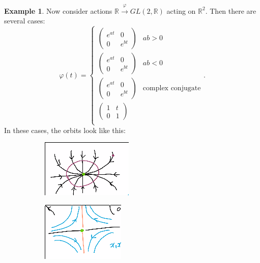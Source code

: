 \documentclass[leqno, openany]{memoir}
\theoremstyle{definition}
\newtheorem{exm}[thm]{Example}
\theoremstyle{remark}
\theoremstyle{plain}
\theoremstyle{definition}
\theoremstyle{remark}
\newcommand{\R}{\mathbb{R}}
\begin{document}
\begin{exm} Now consider actions $\R \xrightarrow{\varphi} GL(2,\R)$ acting on
    $\R^2$. Then there are several cases: \[ \varphi(t) = \begin{cases}
        \begin{pmatrix} e^{at} & 0 \\ 0 & e^{bt} \end{pmatrix} & ab > 0 \\
        \begin{pmatrix} e^{at} & 0 \\ 0 & e^{bt} \end{pmatrix} & ab < 0 \\
        \begin{pmatrix} e^{at} & 0 \\ 0 & e^{bt} \end{pmatrix} & \text{complex
        conjugate} \\ \begin{pmatrix} 1 & t \\ 0 & 1 \end{pmatrix} &  \\
    \end{cases}. \] In these cases, the orbits look like this:
    \begin{figure}[H] \centering \begin{subfigure}[b]{0.2\textwidth}
        \begin{center} \includegraphics[scale=0.6]{orbits1.png} \end{center}
        \caption{} \label{fig:} \end{subfigure}
        \begin{subfigure}[b]{0.2\textwidth} \begin{center}
            \includegraphics[scale=0.6]{orbits2.png} \end{center} \caption{}
            \label{fig:} \end{subfigure} \begin{subfigure}[b]{0.2\textwidth}

\end{subfigure}
\end{figure}
\end{exm}
\end{document}
